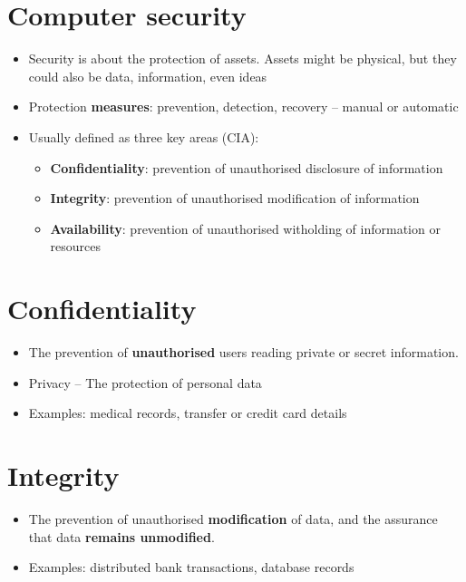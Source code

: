 \documentclass{article}
\begin{document}
\tableofcontents

\newpage

\section{Computer security}
\begin{itemize}
  \item Security is about the protection of assets. Assets might be physical, but they could also be data, information, even ideas
  \item Protection \textbf{measures}: prevention, detection, recovery – manual or automatic
  \item Usually defined as three key areas (CIA):
  \begin{itemize}
    \item \textbf{Confidentiality}: prevention of unauthorised disclosure of information
    \item \textbf{Integrity}: prevention of unauthorised modification of information
    \item \textbf{Availability}: prevention of unauthorised witholding of information or resources
  \end{itemize}
\end{itemize}

\section{Confidentiality}
\begin{itemize}
  \item The prevention of \textbf{unauthorised} users reading private or secret information.
  \item Privacy – The protection of personal data
  \item Examples: medical records, transfer or credit card details
\end{itemize}

\section{Integrity}
\begin{itemize}
  \item The prevention of unauthorised \textbf{modification} of data, and the assurance that data \textbf{remains unmodified}.
  \item Examples: distributed bank transactions, database records
\end{itemize}
\end{document}
